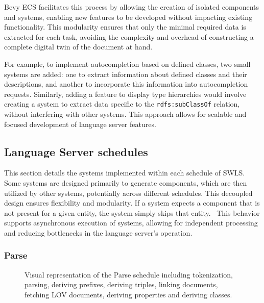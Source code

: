 Bevy ECS facilitates this process by allowing the creation of isolated components and systems, enabling new features to be developed without impacting existing functionality.
This modularity ensures that only the minimal required data is extracted for each task, avoiding the complexity and overhead of constructing a complete digital twin of the document at hand.

For example, to implement autocompletion based on defined classes, two small systems are added:
  one to extract information about defined classes and their descriptions,
  and another to incorporate this information into autocompletion requests. 
Similarly, adding a feature to display type hierarchies would involve creating a system to extract data specific to the \texttt{rdfs:subClassOf} relation, without interfering with other systems.
This approach allows for scalable and focused development of language server features.


\subsection{Language Server schedules}

This section details the systems implemented within each schedule of SWLS.
Some systems are designed primarily to generate components, which are then utilized by other systems, potentially across different schedules.
This decoupled design ensures flexibility and modularity. 
If a system expects a component that is not present for a given entity, the system simply skips that entity.~
This behavior supports asynchronous execution of systems, allowing for independent processing and reducing bottlenecks in the language server’s operation.

\subsubsection{Parse}

\begin{figure}[tb]
 \centering
  \caption{Visual representation of the Parse schedule including tokenization, parsing, deriving prefixes, deriving triples, linking documents, fetching LOV documents, deriving properties and deriving classes. }\label{fig:Parse}
\end{figure}

